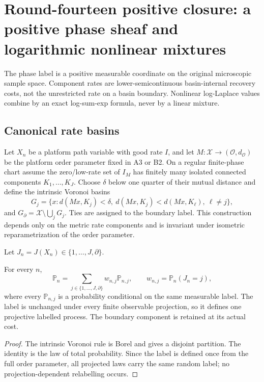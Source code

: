 
\section{Round-fourteen positive closure: a positive phase sheaf and logarithmic nonlinear mixtures}
\label{sec:r14-d1}

The phase label is a positive measurable coordinate on the original
microscopic sample space.  Component rates are lower-semicontinuous
basin-internal recovery costs, not the unrestricted rate on a basin boundary.
Nonlinear log-Laplace values combine by an exact log-sum-exp formula, never
by a linear mixture.

\subsection{Canonical rate basins}

Let \(X_n\) be a platform path variable with good rate \(I\), and let
\(M:\mathcal X\to(\mathcal O,d_{\mathcal O})\) be the platform order parameter
fixed in A3 or B2.  On a regular finite-phase chart assume the zero/low-rate
set of \(I_M\) has finitely many isolated connected components
\(K_1,\ldots,K_J\).  Choose \(\delta\) below one quarter of their mutual
distance and define the intrinsic Voronoi basins
\[
 G_j=\{x:d(Mx,K_j)<\delta,\ 
          d(Mx,K_j)<d(Mx,K_\ell),\ \ell\ne j\},
\]
and \(G_\partial=\mathcal X\setminus\bigcup_jG_j\).
Ties are assigned to the boundary label.  This construction depends only on
the metric rate components and is invariant under isometric
reparametrization of the order parameter.

Let \(J_n=J(X_n)\in\{1,\ldots,J,\partial\}\).

\begin{theorem}
\label{thm:r14-d1-label}
For every \(n\),
\[
 \mathbb P_n
 =
 \sum_{j\in\{1,\ldots,J,\partial\}}
 w_{n,j}\mathbb P_{n,j},
 \qquad
 w_{n,j}=\mathbb P_n(J_n=j),
\]
where every \(\mathbb P_{n,j}\) is a probability conditional on the same
measurable label.  The label is unchanged under every finite observable
projection, so it defines one projective labelled process.  The boundary
component is retained at its actual cost.
\end{theorem}

\begin{proof}
The intrinsic Voronoi rule is Borel and gives a disjoint partition.  The
identity is the law of total probability.  Since the label is defined once
from the full order parameter, all projected laws carry the same random
label; no projection-dependent relabelling occurs.
\end{proof}

